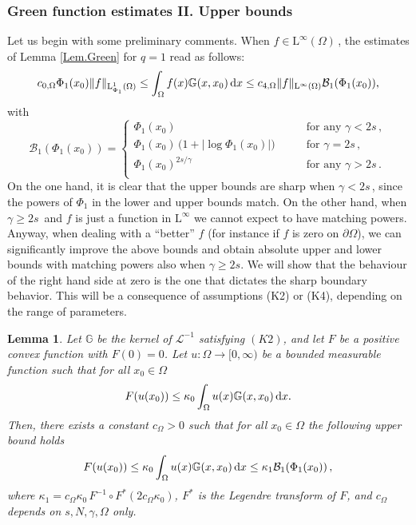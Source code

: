 \documentclass[11pt]{article}
\newtheorem{lem}[thm]{Lemma}
\numberwithin{equation}{section}
\newcommand{\dx}{\,{\rm d}x}
\def\LL{\mathrm{L}} %
\newcommand{\AI}{\mathcal{L}^{-1}}
\newcommand{\n}{F}
\newcommand{\nl}{{F^*}}
\newcommand{\K}{{\mathbb G}}
\newcommand{\B}{\mathcal{B}}
\begin{document}
\subsubsection{Green function estimates II. Upper bounds}\label{app.green1}
Let us begin with some preliminary comments. When $f\in \LL^\infty(\Omega)$\,, the estimates of Lemma \ref{Lem.Green} for $q=1$  read as follows:
\begin{equation}\label{rem1.1.Green}
c_{0,\Omega}\Phi_1(x_0) \|f\|_{\LL^1_{\Phi_1}(\Omega)}\le \int_\Omega f(x)\K(x,x_0)\dx\le c_{4,\Omega}\|f\|_{\LL^\infty(\Omega)}\B_1(\Phi_1(x_0)),
\end{equation}
with
\begin{equation}\label{rem1.2.Green}
\B_1(\Phi_1(x_0))=\left\{\begin{array}{lll}
\Phi_1(x_0) & \qquad\mbox{for any } \gamma <2s\,,\\%
\Phi_1(x_0)\, \big(1+\big|\log\Phi_1(x_0)\big|\bigr)  & \qquad\mbox{for }\gamma =2s\,,\\%
\Phi_1(x_0)^{2s/\gamma} & \qquad\mbox{for any }\gamma >2s\,.\\
\end{array}\right.
\end{equation}
On the one hand, it is clear  that the upper bounds are sharp when $\gamma<2s$\,, since the powers of $\Phi_1$ in the lower and upper bounds match. On the other hand, when $\gamma \ge 2s$\ and $f$ is just a function in $\LL^\infty$ we cannot expect to have matching powers. Anyway, when dealing with a ``better'' $f$ (for instance if $f$ is zero on $\partial\Omega$), we can significantly improve the above bounds and obtain absolute upper and lower bounds with matching powers also when $\gamma \ge 2s$. We will show that the behaviour of the right hand side at zero is the one that dictates the sharp boundary behavior. This will be a consequence of assumptions (K2) or (K4), depending on the range of parameters.\vspace{-1mm}
%
%
\begin{lem}\label{Lem.Green.2}Let $\K$ be the kernel of $\AI$ satisfying $(K2)$, and let $F$ be a positive convex function with $\n(0)=0$.
Let $u:\Omega \to [0,\infty)$ be a bounded measurable function such  that for all $x_0\in\Omega$
\begin{equation}\label{Lem.Green.2.hyp}
\n(u(x_0))\le \kappa_0\int_{\Omega} u(x)\K(x,x_0)\dx.
\end{equation}
Then, there exists a constant $c_{\Omega}>0$ such that for all $x_0\in \Omega$ the following upper bound holds
\begin{equation}\label{Lem.Green.2.est.Upper.II.c}
\n(u(x_0))\le \kappa_0\int_{\Omega} u(x)\K(x,x_0)\dx\le \kappa_1\B_1(\Phi_1(x_0))\,,
\end{equation}
where $\kappa_1=c_{\Omega}\kappa_0\,\n^{-1}\circ\nl(2c_{\Omega}\kappa_0)$, $F^*$ is the Legendre transform of $F$, and $c_{\Omega} $ depends on $s,N,\gamma,\Omega$ only.
\end{lem}
\end{document}
